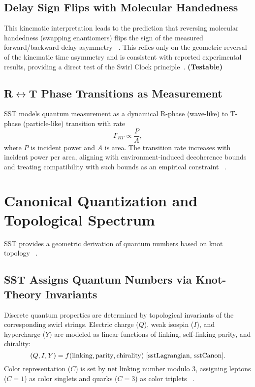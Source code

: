 \documentclass[10pt,reprint,aps,onecolumn,nofootinbib]{revtex4-2}
\newcommand{\testable}{\textbf{(Testable)}}
\begin{document}
        \subsection*{Delay Sign Flips with Molecular Handedness}
            This kinematic interpretation leads to the prediction that reversing molecular handedness (swapping enantiomers) flips the sign of the measured forward/backward delay asymmetry~ \cite{sstAttosecondPhotoionization}. This relies only on the geometric reversal of the kinematic time asymmetry and is consistent with reported experimental results, providing a direct test of the Swirl Clock principle~\cite{sstAttosecondPhotoionization}. \testable

        \subsection*{R$\leftrightarrow$T Phase Transitions as Measurement}
            SST models quantum measurement as a dynamical R-phase (wave-like) to T-phase (particle-like) transition with rate
            \[
                \Gamma_{RT} \propto \frac{P}{A},
            \]
            where $P$ is incident power and $A$ is area. The transition rate increases with incident power per area, aligning with environment-induced decoherence bounds and treating compatibility with such bounds as an empirical constraint~ \cite{sstCanon}.

    \section{Canonical Quantization and Topological Spectrum}\label{sec:quantization}
    SST provides a geometric derivation of quantum numbers based on knot topology~ \cite{sstCanon,sstLagrangian,Kauffman2001}.

        \subsection*{SST Assigns Quantum Numbers via Knot-Theory Invariants}
            Discrete quantum properties are determined by topological invariants of the corresponding swirl strings. Electric charge ($Q$), weak isospin ($I$), and hypercharge ($Y$) are modeled as linear functions of linking, self-linking parity, and chirality:
            \[
                (Q, I, Y) = f(\text{linking}, \text{parity}, \text{chirality})~\cite{sstLagrangian, sstCanon}.
            \]
            Color representation ($C$) is set by net linking number modulo $3$, assigning leptons ($C=1$) as color singlets and quarks ($C=3$) as color triplets~ \cite{sstLagrangian}.
\end{document}
